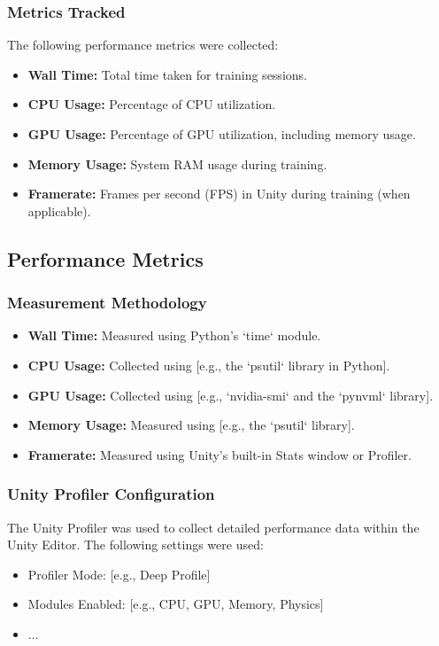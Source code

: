 \subsubsection{Metrics Tracked}
The following performance metrics were collected:
\begin{itemize}
    \item \textbf{Wall Time:} Total time taken for training sessions.
    \item \textbf{CPU Usage:} Percentage of CPU utilization.
    \item \textbf{GPU Usage:} Percentage of GPU utilization, including memory usage.
    \item \textbf{Memory Usage:} System RAM usage during training.
    \item \textbf{Framerate:} Frames per second (FPS) in Unity during training (when applicable).
\end{itemize}

\subsection{Performance Metrics}

\subsubsection{Measurement Methodology}
\begin{itemize}
    \item \textbf{Wall Time:} Measured using Python's `time` module.
    \item \textbf{CPU Usage:} Collected using [e.g., the `psutil` library in Python].
    \item \textbf{GPU Usage:} Collected using [e.g., `nvidia-smi` and the `pynvml` library].
    \item \textbf{Memory Usage:} Measured using [e.g., the `psutil` library].
    \item \textbf{Framerate:} Measured using Unity's built-in Stats window or Profiler.
\end{itemize}

\subsubsection{Unity Profiler Configuration}
The Unity Profiler was used to collect detailed performance data within the Unity Editor. The following settings were used:
\begin{itemize}
    \item Profiler Mode: [e.g., Deep Profile]
    \item Modules Enabled: [e.g., CPU, GPU, Memory, Physics]
    \item ...
\end{itemize}

